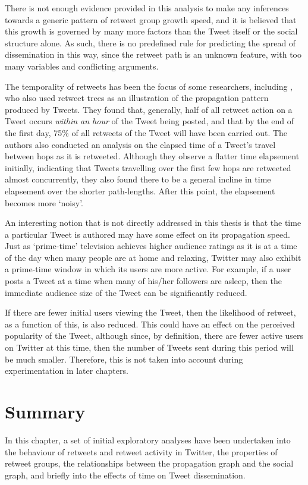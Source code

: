There is not enough evidence provided in this analysis to make any inferences towards a generic pattern of retweet group growth speed, and it is believed that this growth is governed by many more factors than the Tweet itself or the social structure alone. As such, there is no predefined rule for predicting the spread of dissemination in this way, since the retweet path is an unknown feature, with too many variables and conflicting arguments.

The temporality of retweets has been the focus of some researchers, including \citet{kwak10}, who also used retweet trees as an illustration of the propagation pattern produced by Tweets. They found that, generally, half of all retweet action on a Tweet occurs \textit{within an hour} of the Tweet being posted, and that by the end of the first day, 75\% of all retweets of the Tweet will have been carried out. The authors also conducted an analysis on the elapsed time of a Tweet's travel between hops as it is retweeted. Although they observe a flatter time elapsement initially, indicating that Tweets travelling over the first few hops are retweeted almost concurrently, they also found there to be a general incline in time elapsement over the shorter path-lengths. After this point, the elapsement becomes more `noisy'. 

An interesting notion that is not directly addressed in this thesis is that the time a particular Tweet is authored may have some effect on its propagation speed. Just as `prime-time' television achieves higher audience ratings as it is at a time of the day when many people are at home and relaxing, Twitter may also exhibit a prime-time window in which its users are more active. For example, if a user posts a Tweet at a time when many of his/her followers are asleep, then the immediate audience size of the Tweet can be significantly reduced.

If there are fewer initial users viewing the Tweet, then the likelihood of retweet, as a function of this, is also reduced. This could have an effect on the perceived popularity of the Tweet, although since, by definition, there are fewer active users on Twitter at this time, then the number of Tweets sent during this period will be much smaller. Therefore, this is not taken into account during experimentation in later chapters.


\section{Summary}
In this chapter, a set of initial exploratory analyses have been undertaken into the behaviour of retweets and retweet activity in Twitter, the properties of retweet groups, the relationships between the propagation graph and the social graph, and briefly into the effects of time on Tweet dissemination.

